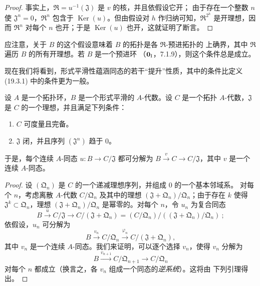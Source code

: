\begin{proof}
事实上，$\mathfrak R=u^{-1}(\mathfrak J)$ 是 $v$ 的核，并且依假设它开；
由于存在一个整数 $n$ 使 $\mathfrak J^n=0$，$\mathfrak R^n$ 包含于
$\operatorname{Ker}(u)$。但由假设对 $h$ 作归纳可知，$\mathfrak R^{2^h}$
是开理想，因而 $\mathfrak R^n$ 对每个 $n$ 也开；于是
$\operatorname{Ker}(u)$ 也开，这就证明了断言。
\end{proof}

应注意，关于 $B$ 的这个假设意味着 $B$ 的拓扑是各 $\mathfrak R$-预进拓扑的
上确界，其中 $\mathfrak R$ 遍历 $B$ 的所有开理想。若 $B$ 是一个预进环
（$\mathbf 0_{\rm I}$，7.1.9），则这个条件总是成立。

\begin{env}[19.3.9]
\label{0.19.3.9-fr}
现在我们将看到，形式平滑性蕴涵同态的若干“提升”性质，其中的条件比定义
(19.3.1) 中的条件更为一般。
\end{env}


\begin{proposition}[19.3.10]
\label{0.19.3.10-fr}
设 $A$ 是一个拓扑环，$B$ 是一个形式平滑的 $A$-代数。设 $C$ 是一个拓扑
$A$-代数，$\mathfrak J$ 是 $C$ 的一个理想，并且满足下列条件：
\begin{enumerate}
  \item[$1^\circ$] $C$ 可度量且完备。
  \item[$2^\circ$] $\mathfrak J$ 闭，并且序列 $(\mathfrak J^n)$ 趋于 $0$。
\end{enumerate}
于是，每个连续 $A$-同态 $u:B\to C/\mathfrak J$ 都可分解为
$B\xrightarrow{v}C\to C/\mathfrak J$，其中 $v$ 是一个连续 $A$-同态。
\end{proposition}

\begin{proof}
设 $(\mathfrak Q_n)$ 是 $C$ 的一个递减理想序列，并组成 $0$ 的一个基本邻域系。
对每个 $n$，考虑离散 $A$-代数 $C/\mathfrak Q_n$ 及其中的理想
$(\mathfrak J+\mathfrak Q_n)/\mathfrak Q_n$；由于存在 $k$ 使得
$\mathfrak J^k\subset\mathfrak Q_n$，理想
$(\mathfrak J+\mathfrak Q_n)/\mathfrak Q_n$ 是幂零的。对每个 $n$，令 $u_n$
为复合同态
\[
  B\xrightarrow{u}C/\mathfrak J\to C/(\mathfrak J+\mathfrak Q_n)
  =(C/\mathfrak Q_n)/((\mathfrak J+\mathfrak Q_n)/\mathfrak Q_n)~;
\]
依假设，$u_n$ 可分解为
\[
  B\xrightarrow{v_n}C/\mathfrak Q_n
  \xrightarrow{\varphi_n}C/(\mathfrak J+\mathfrak Q_n),
\]
其中 $v_n$ 是一个连续 $A$-同态。我们来证明，可以逐个选择 $v_n$，使得
$v_n$ 分解为
\[
  B\xrightarrow{v_{n+1}}C/\mathfrak Q_{n+1}\to C/\mathfrak Q_n
\]
对每个 $n$ 都成立（换言之，各 $v_n$ 组成一个同态的\emph{逆系统}）。这将由
下列引理得出。
\end{proof}

